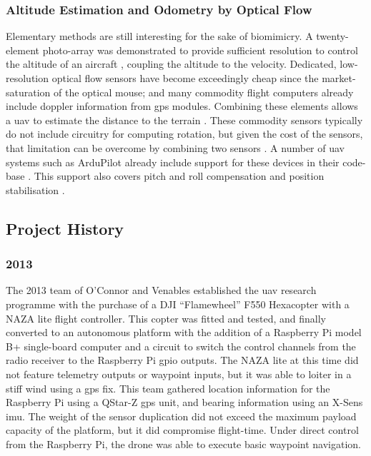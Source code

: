 \documentclass[a4paper, 11pt, titlepage]{article}
\begin{document}
      \subsubsection{Altitude Estimation and Odometry by Optical Flow}
        Elementary methods are still interesting for the sake of biomimicry.  A twenty-element photo-array was demonstrated to provide sufficient resolution to control the altitude of an aircraft \cite{optoAlt}, coupling the altitude to the velocity.
        Dedicated, low-resolution optical flow sensors have become exceedingly cheap since the market-saturation of the optical mouse; and many commodity flight computers already include doppler information from \gls{gps} modules. 
        Combining these elements allows a \gls{uav} to estimate the distance to the terrain \cite{RemTerrain}.  These commodity sensors typically do not include circuitry for computing rotation, but given the cost of the sensors, that limitation can be overcome by combining two sensors \cite{FlowRot}.
        A number of \gls{uav} systems such as ArduPilot already include support for these devices in their code-base \cite{ArduFlow}.
        This support also covers pitch and roll compensation and position stabilisation \cite{ArduFlow} \cite{OptoFlowStab}.


    \subsection{Project History}

      \subsubsection{2013}
        The 2013 team of O'Connor \cite{OConnor} and Venables \cite{Venables} established the \gls{uav} research programme with the purchase of a DJI ``Flamewheel'' F550 Hexacopter with a NAZA lite flight controller.  This copter was fitted and tested, and finally converted to an autonomous platform with the addition of a Raspberry Pi model B+ single-board computer and a circuit to switch the control channels from the radio receiver to the Raspberry Pi \gls{gpio} outputs.
        The NAZA lite at this time did not feature telemetry outputs or waypoint inputs, but it was able to loiter in a stiff wind using a \gls{gps} fix.
        This team gathered location information for the Raspberry Pi using a QStar-Z \gls{gps} unit, and bearing information using an X-Sens \gls{imu}.  The weight of the sensor duplication did not exceed the maximum payload capacity of the platform, but it did compromise flight-time.
        Under direct control from the Raspberry Pi, the drone was able to execute basic waypoint navigation.
\end{document}
